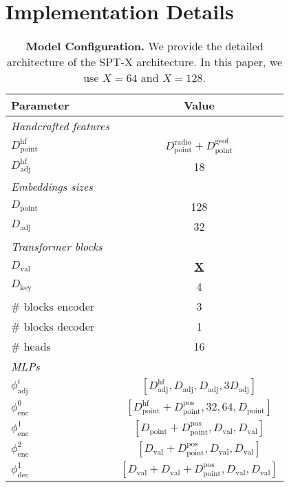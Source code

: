 \fi

\section{Implementation Details}
\label{sec:implem}

\begin{table}
\caption{\textbf{Model Configuration.} We provide the detailed architecture of the
SPT-X architecture. In this paper, we use $X=64$ and $X=128$.
}
\label{tab:implementation}
\centering
\small{
\begin{tabular}{@{}lc@{}}
    \toprule
    Parameter & Value \\
    \midrule
     {\it Handcrafted features} \\
    $D_\text{point}^{\text{hf}}$ & $D_\text{point}^{\text{radio}} + D_\text{point}^{\text{geof}}$ \\
    $D_\text{adj}^{\text{hf}}$  & 18 \\
    \midrule
    {\it Embeddings sizes} \\
    $D_\text{point}$         & 128 \\
    $D_\text{adj}$           & 32 \\
    \midrule
    {\it Transformer blocks} \\
    $D_\text{val}$           & \underline{\textbf{X}} \\
    $D_\text{key}$           & 4 \\
    \# blocks encoder        & 3 \\
    \# blocks decoder        & 1 \\
    \# heads                 & 16 \\
    \midrule
    {\it MLPs} \\
    $\phi_\text{adj}^i$      & \footnotesize $[D_\text{adj}^{\text{hf}}, D_\text{adj}, D_\text{adj}, 3 D_\text{adj}]$  \\
    $\phi^0_\text{enc}$      & \footnotesize $[D_\text{point}^{\text{hf}} + D_\text{point}^{\text{pos}}, 32, 64, D_\text{point}]$ \\
    $\phi^1_\text{enc}$      & \footnotesize $[D_\text{point} + D_\text{point}^{\text{pos}}, D_\text{val}, D_\text{val}]$ \\
    $\phi^2_\text{enc}$      & \footnotesize $[D_\text{val} + D_\text{point}^{\text{pos}}, D_\text{val}, D_\text{val}]$ \\
    $\phi^1_\text{dec}$      & \footnotesize $[D_\text{val} + D_\text{val} + D_\text{point}^{\text{pos}}, D_\text{val}, D_\text{val}]$ \\

    \bottomrule
\end{tabular}}
\end{table} 
